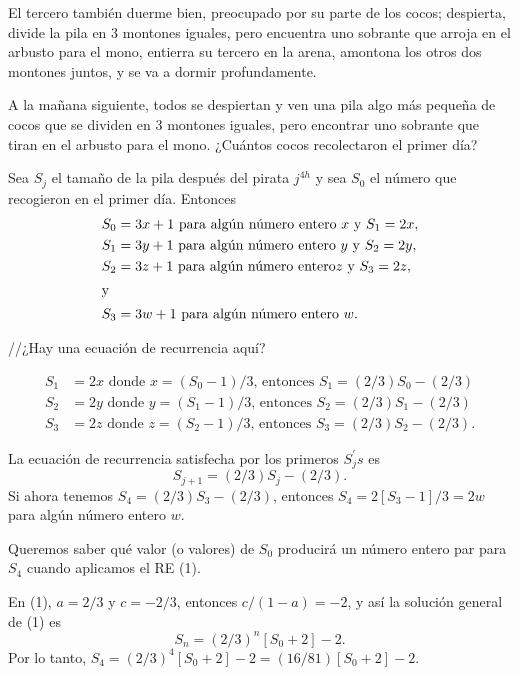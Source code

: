 El tercero también duerme bien, preocupado por su parte de los cocos; despierta, divide la pila en 3 montones iguales, pero encuentra uno sobrante que arroja en el arbusto para el mono, entierra su tercero en la arena, amontona los otros dos montones juntos, y se va a dormir profundamente.

A la mañana siguiente, todos se despiertan y ven una pila algo más pequeña de cocos que se dividen en 3 montones iguales, pero encontrar uno sobrante que tiran en el arbusto para el mono. ¿Cuántos cocos recolectaron el primer día?

Sea $S_{j}$ el tamaño de la pila después del pirata $j^{4h}$ y sea $S_{0}$ el número que recogieron en el primer día. Entonces
\begin{align*}
S_{0}
&=3x+1\text{ para algún número entero }x\text{ y }S_1=2x,\\
S_{1}
&= 3y+1\text{ para algún número entero }y\text{ y }S_2=2y,\\
S_{2}
&=3z+1\text{ para algún número entero}z\text{ y }S_3=2z,\\
\intertext{y}
S_{3}
&=3w+1\text{ para algún número entero }w.
\end{align*}

//¿Hay una ecuación de recurrencia aquí?

\begin{align*}
S_{1}
&=2x\text{ donde }x=(S_{0}-1)/3\text{, entonces }S_{1}=(2/3)S_0-(2/3)\\
S_{2}
&=2y\text{ donde }y=(S_{1}-1)/3\text{, entonces }S_{2}=(2/3)S_1-(2/3)\\
S_{3}
&=2z\text{ donde }z=(S_{2}-1)/3\text{, entonces }S_{3}=(2/3)S_2-(2/3).
\end{align*}

La ecuación de recurrencia satisfecha por los primeros $S_{j}^{\prime}s$ es
\begin{equation}
S_{j+1}=(2/3)S_{j}-(2/3).
\end{equation}
Si ahora tenemos $S_{4}=(2/3)S_{3}-(2/3)$, entonces $S_{4}=2[S_{3}-1]/3=2w$ para algún número entero $w$.

Queremos saber qué valor (o valores) de $S_0$ producirá un número entero par para $S_4$ cuando aplicamos el RE (1).

En (1), $a=2/3$ y $c=-2/3$, entonces $c/(1-a) = -2$, y así la solución general de (1) es
\begin{equation*}
S_{n}= (2/3)^{n}\left[S_0 + 2\right]-2.
\end{equation*}
Por lo tanto, $S_{4}=(2/3)^{4}[S_0+2]-2=(16/81)\left[S_0 + 2\right]-2$.


